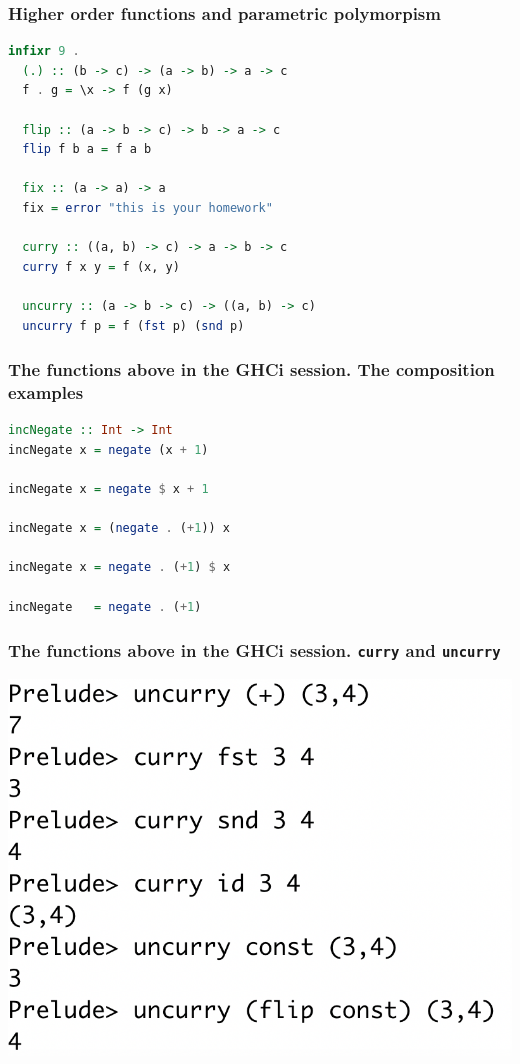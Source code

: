 \documentclass[10pt,pdf,utf8,russian,aspectratio=169]{beamer}
\begin{document}
\begin{frame}[fragile]
  \frametitle{Higher order functions and parametric polymorpism}

  \begin{lstlisting}[language=Haskell]
  infixr 9 .
  (.) :: (b -> c) -> (a -> b) -> a -> c
  f . g = \x -> f (g x)

  flip :: (a -> b -> c) -> b -> a -> c
  flip f b a = f a b

  fix :: (a -> a) -> a
  fix = error "this is your homework"

  curry :: ((a, b) -> c) -> a -> b -> c
  curry f x y = f (x, y)

  uncurry :: (a -> b -> c) -> ((a, b) -> c)
  uncurry f p = f (fst p) (snd p)
  \end{lstlisting}
\end{frame}

\begin{frame}[fragile]
    \frametitle{The functions above in the GHCi session. The composition examples}

\begin{lstlisting}[language=Haskell]
incNegate :: Int -> Int
incNegate x = negate (x + 1)

incNegate x = negate $ x + 1

incNegate x = (negate . (+1)) x

incNegate x = negate . (+1) $ x

incNegate   = negate . (+1)
\end{lstlisting}
\end{frame}

\begin{frame}
  \frametitle{The functions above in the GHCi session. \verb"curry" and \verb"uncurry"}

  \begin{center}
  \includegraphics[scale=0.554]{Pics/Curry.png}
  \end{center}
\end{frame}
\end{document}
